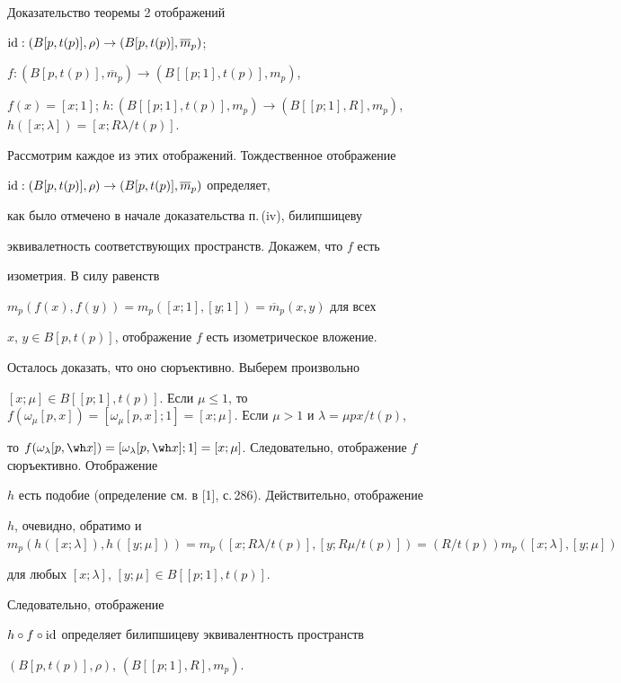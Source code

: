 \begin{pf*}{Доказательство теоремы 2}
отображений


$\operatorname{id} : (B[p,t(p)],\rho) \rightarrow (B[p,t(p)],\overline {m}_p)$;


$f:(B[p,t(p)],\overline {m}_p) \rightarrow (B[[p;1],t(p)],m_p)$,


$f(x)=[x;1]$; $h : (B[[p;1],t(p)],m_p) \rightarrow


(B[[p;1],R],m_p)$, $h([x;\lambda])=[x;R\lambda/t(p)]$.


Рассмотрим каждое из этих отображений. Тождественное отображение


$\operatorname{id} : (B[p,t(p)],\rho) \rightarrow (B[p,t(p)],\overline {m}_p)$ определяет,


как было отмечено в начале доказательства п.\,(iv), билипшицеву


эквивалетность соответствующих пространств. Докажем, что $f$ есть


изометрия. В силу равенств


$m_p(f(x),f(y))=m_p([x;1],[y;1])=\overline {m}_p(x,y)$ для всех


$x$, $y \in B[p,t(p)]$, отображение $f$ есть изометрическое вложение.


Осталось доказать, что оно сюръективно. Выберем произвольно


$[x;\mu] \in B[[p;1],t(p)]$. Если $\mu \leq 1$, то $f(\omega_{\mu}[p,x])=


[\omega_{\mu}[p,x];1]=[x;\mu]$. Если $\mu>1$ и $\lambda=\mu px/t(p)$,


то $f(\omega_{\lambda}[p,\wh x])=[\omega_{\lambda}[p,\wh x];1]=


[x;\mu]$. Следовательно, отображение $f$ сюръективно. Отображение


$h$ есть подобие (определение см. в [1], с.\,286). Действительно, отображение


$h$, очевидно, обратимо и $m_p(h([x;\lambda]),h([y;\mu]))=


m_p([x;R\lambda/t(p)],[y;R\mu/t(p)])=


(R/t(p))m_p([x;\lambda],[y;\mu])$


для любых $[x;\lambda]$, $[y;\mu] \in B[[p;1],t(p)]$.


Следовательно, отображение


$h\circ f\circ \operatorname{id}$ определяет билипшицеву эквивалентность пространств


$(B[p,t(p)],\rho)$, $(B[[p;1],R],m_p)$.


\end{pf*}









